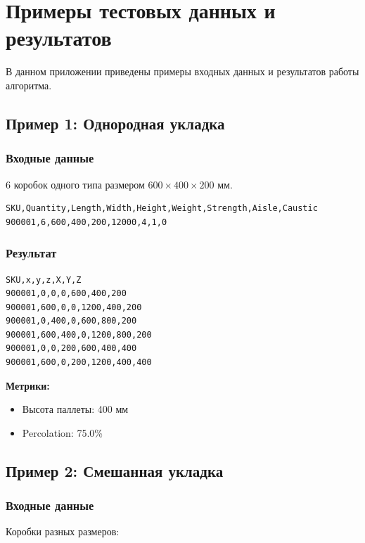 \chapter{Примеры тестовых данных и результатов}
\label{app:examples}

В данном приложении приведены примеры входных данных и результатов работы алгоритма.

\section{Пример 1: Однородная укладка}

\subsection{Входные данные}
6 коробок одного типа размером $600 \times 400 \times 200$ мм.

\begin{verbatim}
SKU,Quantity,Length,Width,Height,Weight,Strength,Aisle,Caustic
900001,6,600,400,200,12000,4,1,0
\end{verbatim}

\subsection{Результат}
\begin{verbatim}
SKU,x,y,z,X,Y,Z
900001,0,0,0,600,400,200
900001,600,0,0,1200,400,200
900001,0,400,0,600,800,200
900001,600,400,0,1200,800,200
900001,0,0,200,600,400,400
900001,600,0,200,1200,400,400
\end{verbatim}

\textbf{Метрики:}
\begin{itemize}
    \item Высота паллеты: 400 мм
    \item Percolation: 75.0\%
\end{itemize}


\section{Пример 2: Смешанная укладка}

\subsection{Входные данные}
Коробки разных размеров:

